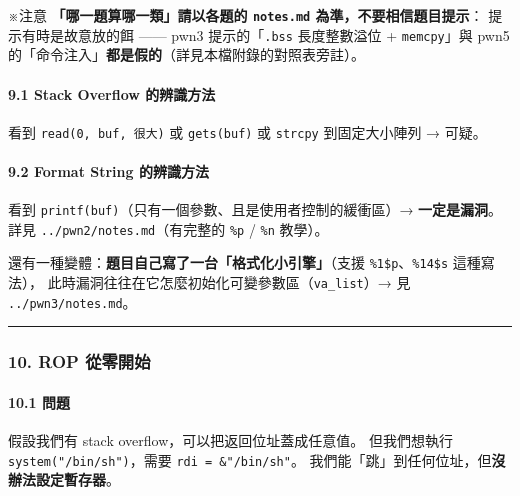 \documentclass[10pt,a4paper]{article}
\renewenvironment{quote}{%
  \begin{mdframed}[linewidth=0pt,innerleftmargin=0pt,innerrightmargin=0pt,
    innerbottommargin=0pt,innertopmargin=0pt,skipabove=0.55em,skipbelow=0.55em,
    leftmargin=0.9em,rightmargin=0.4em,startcode={\color{quotebar}\vrule width 2.6pt},%
    endcode={}]%
  \itshape\color{black}%
}{%
  \end{mdframed}%
}
\begin{document}
\begin{quote}
※注意 \textbf{「哪一題算哪一類」請以各題的 \texttt{notes.\allowbreak{}md}
為準，不要相信題目提示}： 提示有時是故意放的餌 ------ pwn3
提示的「\texttt{.\allowbreak{}bss} 長度整數溢位 + \texttt{memcpy}」與 pwn5
的「命令注入」\textbf{都是假的}（詳見本檔附錄的對照表旁註）。
\end{quote}

\paragraph{9.1 Stack Overflow
的辨識方法}\label{stack-overflow-ux7684ux8fa8ux8b58ux65b9ux6cd5}

看到 \texttt{read(0,\allowbreak{}\ \allowbreak{}buf,\allowbreak{}\ \allowbreak{}很大)} 或 \texttt{gets(buf)} 或
\texttt{strcpy} 到固定大小陣列 → 可疑。

\paragraph{9.2 Format String
的辨識方法}\label{format-string-ux7684ux8fa8ux8b58ux65b9ux6cd5}

看到 \texttt{printf(buf)}（只有一個參數、且是使用者控制的緩衝區）→
\textbf{一定是漏洞}。 詳見 \texttt{../\allowbreak{}pwn2/\allowbreak{}notes.\allowbreak{}md}（有完整的
\texttt{\%\allowbreak{}p} / \texttt{\%\allowbreak{}n} 教學）。

還有一種變體：\textbf{題目自己寫了一台「格式化小引擎」}（支援
\texttt{\%\allowbreak{}1\$\allowbreak{}p}、\texttt{\%\allowbreak{}14\$\allowbreak{}s} 這種寫法），
此時漏洞往往在它怎麼初始化可變參數區（\texttt{va\_\allowbreak{}list}）→ 見
\texttt{../\allowbreak{}pwn3/\allowbreak{}notes.\allowbreak{}md}。

\begin{center}\rule{0.5\linewidth}{0.5pt}\end{center}

\subsubsection{10. ROP 從零開始}\label{rop-ux5f9eux96f6ux958bux59cb}

\paragraph{10.1 問題}\label{ux554fux984c}

假設我們有 stack overflow，可以把返回位址蓋成任意值。 但我們想執行
\texttt{system("/\allowbreak{}bin/\allowbreak{}sh")}，需要 \texttt{rdi\ \allowbreak{}=\ \allowbreak{}\&\allowbreak{}"/\allowbreak{}bin/\allowbreak{}sh"}。
我們能「跳」到任何位址，但\textbf{沒辦法設定暫存器}。
\end{document}
